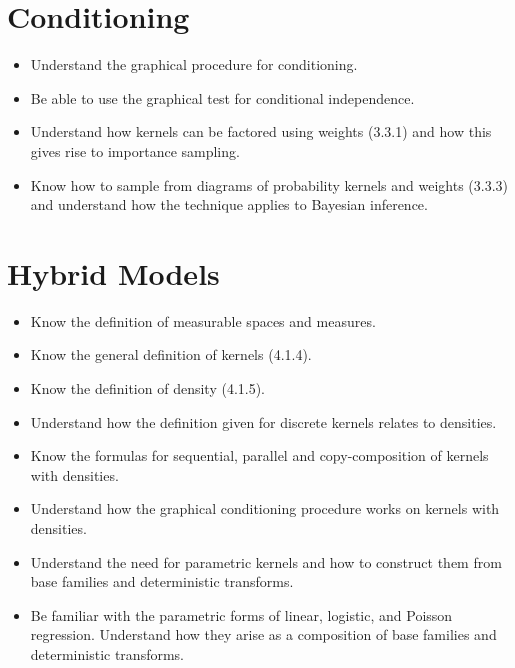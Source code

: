 \documentclass[11pt, a4paper]{article}
\begin{document}
\section{Conditioning}

\begin{itemize}
  \item Understand the graphical procedure for conditioning.
  \item Be able to use the graphical test for conditional independence.
  \item Understand how kernels can be factored using weights (3.3.1) and how this gives rise to importance sampling.
  \item Know how to sample from diagrams of probability kernels and weights (3.3.3) and understand how the technique applies to Bayesian inference.
\end{itemize}

\newpage

\section{Hybrid Models}

\begin{itemize}
  \item Know the definition of measurable spaces and measures.
  \item Know the general definition of kernels (4.1.4).
  \item Know the definition of density (4.1.5).
  \item Understand how the definition given for discrete kernels relates to densities.
  \item Know the formulas for sequential, parallel and copy-composition of kernels with densities.
  \item Understand how the graphical conditioning procedure works on kernels with densities.
  \item Understand the need for parametric kernels and how to construct them from base families and deterministic transforms.
  \item Be familiar with the parametric forms of linear, logistic, and Poisson regression. Understand how they arise as a composition of base families and deterministic transforms.
\end{itemize}

\end{document}
